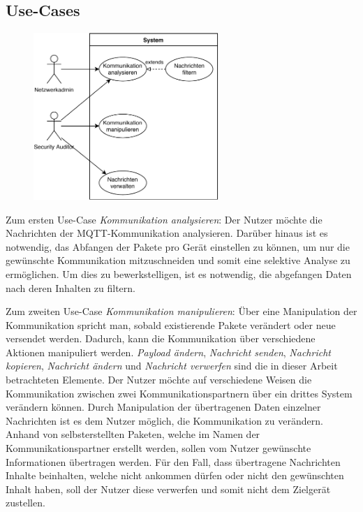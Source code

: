     \subsection{Use-Cases}
    \begin{figure}[h]%
        \centering
        \includegraphics[width=7cm]{tex/bilder/3_anforderungen/Use-Case.pdf}
        \label{fig:use-case}
    \end{figure}
    
    Zum ersten Use-Case \emph{Kommunikation analysieren}:
    	Der Nutzer möchte die Nachrichten der \ac{MQTT}-Kommunikation analysieren.
    	Darüber hinaus ist es notwendig, das Abfangen der Pakete pro Gerät einstellen zu können, um nur die gewünschte Kommunikation mitzuschneiden und somit eine selektive Analyse zu ermöglichen.
    	Um dies zu bewerkstelligen, ist es notwendig, die abgefangen Daten nach deren Inhalten zu filtern.
    	
    Zum zweiten Use-Case \emph{Kommunikation manipulieren}:
        Über eine Manipulation der Kommunikation spricht man, sobald existierende Pakete verändert oder neue versendet werden. Dadurch, kann die Kommunikation über verschiedene Aktionen manipuliert werden. \emph{Payload ändern}, \emph{Nachricht senden}, \emph{Nachricht kopieren}, \emph{Nachricht ändern} und \emph{Nachricht verwerfen} sind die in dieser Arbeit betrachteten Elemente.
    	Der Nutzer möchte auf verschiedene Weisen die Kommunikation zwischen zwei Kommunikationspartnern über ein drittes System verändern können.
    	Durch Manipulation der übertragenen Daten einzelner Nachrichten ist es dem Nutzer möglich, die Kommunikation zu verändern.
    	Anhand von selbsterstellten Paketen, welche im Namen der Kommunikationspartner erstellt werden, sollen vom Nutzer gewünschte Informationen übertragen werden.
    	Für den Fall, dass übertragene Nachrichten Inhalte beinhalten, welche nicht ankommen dürfen oder nicht den gewünschten Inhalt haben, soll der Nutzer diese verwerfen und somit nicht dem Zielgerät zustellen.
    	
